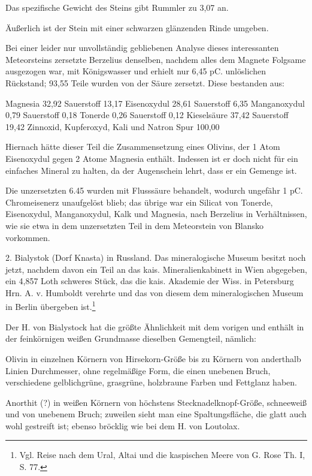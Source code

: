 \documentclass[a4paper, 11pt, oneside]{article}
\begin{document}
Das spezifische Gewicht des Steins gibt Rummler zu 3,07 an.

Äußerlich ist der Stein mit einer schwarzen glänzenden Rinde umgeben.

Bei einer leider nur unvollständig gebliebenen Analyse dieses interessanten Meteorsteins zersetzte Berzelius denselben, nachdem alles dem Magnete Folgsame ausgezogen war, mit Königswasser und erhielt nur 6,45 pC. unlöslichen Rückstand; 93,55 Teile wurden von der Säure zersetzt. Diese bestanden aus:

Magnesia 32,92 Sauerstoff 13,17  
Eisenoxydul 28,61 Sauerstoff 6,35  
Manganoxydul 0,79 Sauerstoff 0,18  
Tonerde 0,26 Sauerstoff 0,12  
Kieselsäure 37,42 Sauerstoff 19,42  
Zinnoxid, Kupferoxyd, Kali und Natron Spur  
100,00  

Hiernach hätte dieser Teil die Zusammensetzung eines Olivins, der 1 Atom Eisenoxydul gegen 2 Atome Magnesia enthält. Indessen ist er doch nicht für ein einfaches Mineral zu halten, da der Augenschein lehrt, dass er ein Gemenge ist.

Die unzersetzten 6.45 wurden mit Flusssäure behandelt, wodurch ungefähr 1 pC. Chromeisenerz unaufgelöst blieb; das übrige war ein Silicat von Tonerde, Eisenoxydul, Manganoxydul, Kalk und Magnesia, nach Berzelius in Verhältnissen, wie sie etwa in dem unzersetzten Teil in dem Meteorstein von Blansko vorkommen.

2. Bialystok (Dorf Knasta) in Russland. Das mineralogische Museum besitzt noch jetzt, nachdem davon ein Teil an das kais. Mineralienkabinett in Wien abgegeben, ein 4,857 Loth schweres Stück, das die kais. Akademie der Wiss. in Petersburg Hrn. A. v. Humboldt verehrte und das von diesem dem mineralogischen Museum in Berlin übergeben ist.\footnote{Vgl. Reise nach dem Ural, Altai und die kaspischen Meere von G. Rose Th. I, S. 77.}

Der H. von Bialystock hat die größte Ähnlichkeit mit dem vorigen und enthält in der feinkörnigen weißen Grundmasse dieselben Gemengteil, nämlich:

Olivin in einzelnen Körnern von Hirsekorn-Größe bis zu Körnern von anderthalb Linien Durchmesser, ohne regelmäßige Form, die einen unebenen Bruch, verschiedene gelblichgrüne, grasgrüne, holzbraune Farben und Fettglanz haben.

Anorthit (?) in weißen Körnern von höchstens Stecknadelknopf-Größe, schneeweiß und von unebenem Bruch; zuweilen sieht man eine Spaltungsfläche, die glatt auch wohl gestreift ist; ebenso bröcklig wie bei dem H. von Loutolax.
\end{document}
